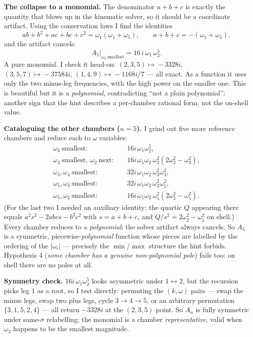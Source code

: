 \documentclass[11pt]{article}
\begin{document}
\medskip
\noindent\textbf{The collapse to a monomial.}
The denominator $a+b+c$ is exactly the quantity that blows up in the kinematic solver, so it
should be a coordinate artifact. Using the conservation laws I find the identities
\[
ab+b^2+ac+bc+c^2=\omega_1(\omega_1+\omega_5),\qquad a+b+c=-(\omega_1+\omega_5),
\]
and the artifact cancels:
\[
A_5\big|_{\omega_2\ \mathrm{smallest}}=16\,i\,\omega_1\,\omega_2^5 .
\]
A pure monomial. I check it head-on: $(2,3,5)\!\mapsto\!-3328i$, $(3,5,7)\!\mapsto\!-37584i$,
$(1,4,9)\!\mapsto\!-1168i/7$ --- all exact. As a function it uses only the two minus-leg
frequencies, with the high power on the smaller one. This is beautiful but it is a
\emph{polynomial}, contradicting ``not a plain polynomial'': another sign that the hint
describes a per-chamber rational form, not the on-shell value.

\medskip
\noindent\textbf{Cataloguing the other chambers ($n=5$).}
I grind out five more reference chambers and reduce each to $\omega$ variables:
\begin{align*}
\omega_2\ \text{smallest}:&\quad 16i\,\omega_1\omega_2^5,\\
\omega_3\ \text{smallest},\ \omega_2\ \text{next}:&\quad 16i\,\omega_1\omega_2\,\omega_3^2(2\omega_2^2-\omega_3^2),\\
\omega_3,\omega_4\ \text{smallest}:&\quad 32i\,\omega_1\omega_2\,\omega_3^2\omega_4^2,\\
\omega_5,\omega_3\ \text{smallest}:&\quad 32i\,\omega_1\omega_2\,\omega_3^2\omega_5^2,\\
\omega_5,\omega_2\ \text{smallest}:&\quad 16i\,\omega_1\omega_2\,\omega_5^2(2\omega_2^2-\omega_5^2).
\end{align*}
(For the last two I needed an auxiliary identity: the quartic $Q$ appearing there equals
$a^2s^2-2abcs-b^2c^2$ with $s=a+b+c$, and $Q/s^2=2\omega_2^2-\omega_5^2$ on shell.) Every
chamber reduces to a \emph{polynomial}; the solver artifact always cancels. So $A_5$ is a
symmetric, piecewise-\emph{polynomial} function whose pieces are labelled by the ordering of
the $|\omega_i|$ --- precisely the $\min/\max$ structure the hint forbids. Hypothesis 4
(\emph{some chamber has a genuine non-polynomial pole}) fails too: on shell there are no
poles at all.

\medskip
\noindent\textbf{Symmetry check.}
$16i\,\omega_1\omega_2^5$ looks asymmetric under $1\leftrightarrow2$, but the recursion picks
leg $1$ as a root, so I test directly: permuting the $(k,\omega)$ pairs --- swap the minus
legs, swap two plus legs, cycle $3\!\to\!4\!\to\!5$, or an arbitrary permutation
$\{3,1,5,2,4\}$ --- all return $-3328i$ at the $(2,3,5)$ point. So $A_n$ is fully symmetric
under same-$\sigma$ relabelling; the monomial is a chamber \emph{representative}, valid when
$\omega_2$ happens to be the smallest magnitude.
\end{document}
